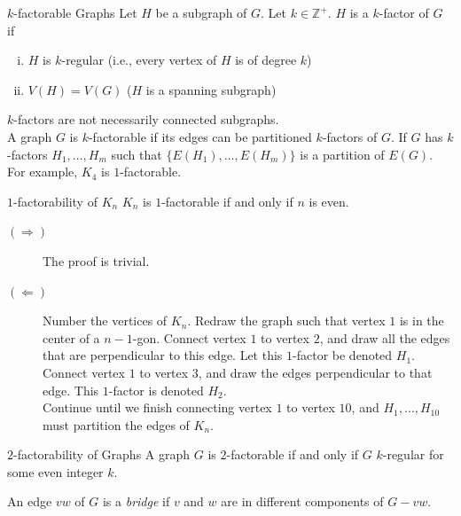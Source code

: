 \documentclass[10pt]{extarticle}
\begin{document}
  \begin{problem}{$k$-factorable Graphs}
    Let $H$ be a subgraph of $G$. Let $k\in\mathbb{Z}^+$. $H$ is a $k$-factor of $G$ if
    \begin{enumerate}[(i)]
      \item $H$ is $k$-regular (i.e., every vertex of $H$ is of degree $k$)
      \item $V(H) = V(G)$ ($H$ is a spanning subgraph)
    \end{enumerate}
    $k$-factors are not necessarily connected subgraphs.\\

    A graph $G$ is $k$-factorable if its edges can be partitioned $k$-factors of $G$. If $G$ has $k$-factors $H_1,\dots,H_m$ such that $\{E(H_1),\dots,E(H_m)\}$ is a partition of $E(G)$.\\

    For example, $K_4$ is $1$-factorable.
    \begin{center}
    \end{center}
    \begin{problem}{$1$-factorability of $K_n$}
      $K_n$ is $1$-factorable if and only if $n$ is even.
      \tcblower
      \begin{description}
        \item[$(\Rightarrow)$] The proof is trivial.
        \item[$(\Leftarrow)$] Number the vertices of $K_n$. Redraw the graph such that vertex $1$ is in the center of a $n-1$-gon. Connect vertex $1$ to vertex $2$, and draw all the edges that are perpendicular to this edge. Let this $1$-factor be denoted $H_1$.\\

          Connect vertex $1$ to vertex $3$, and draw the edges perpendicular to that edge. This $1$-factor is denoted $H_2$.\\

          Continue until we finish connecting vertex $1$ to vertex $10$, and $H_1,\dots,H_{10}$ must partition the edges of $K_n$.
      \end{description}
    \end{problem}
    \begin{problem}{$2$-factorability of Graphs}
      A graph $G$ is $2$-factorable if and only if $G$ $k$-regular for some even integer $k$.
    \end{problem}
    An edge $vw$ of $G$ is a \textit{bridge} if $v$ and $w$ are in different components of $G-vw$.
  \end{problem}
\end{document}
